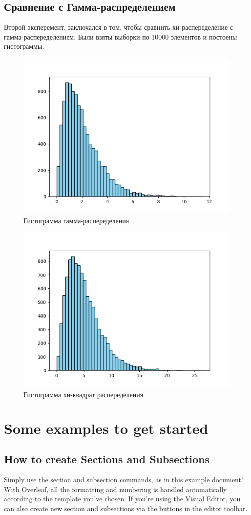 \documentclass{article}
\begin{document}
\subsection{Сравнение с Гамма-распределением}
Второй эксперемент, заключался в том, чтобы сравнить хи-распеределение с гамма-распеределением.
Были взяты выборки по 10000 элементов и постоены гистограммы.

\begin{figure}
      \centering
      \includegraphics[width=0.5\linewidth]{Python/gamma.png}
      \caption{Гистограмма гамма-распеределения}
\end{figure}
\begin{figure}
      \centering
      \includegraphics[width=0.5\linewidth]{Python/chi.png}
      \caption{Гистограмма хи-квадрат распеределения}
\end{figure}




\section{Some examples to get started}

\subsection{How to create Sections and Subsections}

Simply use the section and subsection commands, as in this example document! With Overleaf, all the formatting and numbering is handled automatically according to the template you've chosen. If you're using the Visual Editor, you can also create new section and subsections via the buttons in the editor toolbar.
\end{document}
